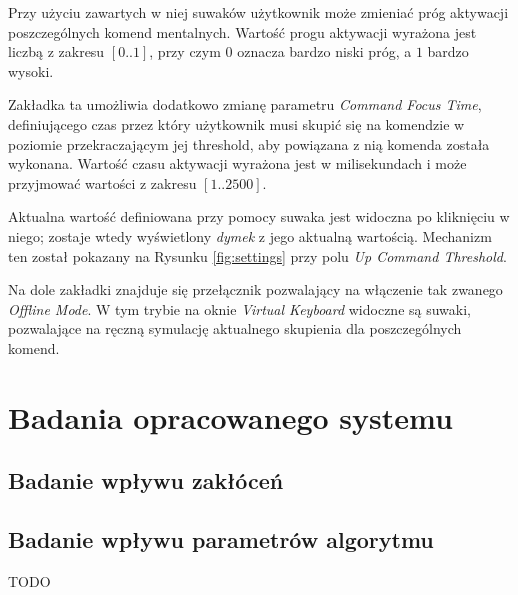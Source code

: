 \documentclass[skorowidz,skroty]{dyplomWEZUT}
\begin{document}
Przy użyciu zawartych w niej suwaków użytkownik może zmieniać próg aktywacji poszczególnych komend mentalnych. Wartość progu aktywacji wyrażona jest liczbą z zakresu $[0..1]$, przy czym $0$ oznacza bardzo niski próg, a $1$ bardzo wysoki.

Zakładka ta umożliwia dodatkowo zmianę parametru \textit{Command Focus Time}, definiującego czas przez który użytkownik musi skupić się na komendzie w poziomie przekraczającym jej threshold, aby powiązana z nią komenda została wykonana. Wartość czasu aktywacji wyrażona jest w milisekundach i może przyjmować wartości z zakresu $[1..2500]$.

Aktualna wartość definiowana przy pomocy suwaka jest widoczna po kliknięciu w niego; zostaje wtedy wyświetlony \textit{dymek} z jego aktualną wartością. Mechanizm ten został pokazany na Rysunku \vref{fig:settings} przy polu \textit{Up Command Threshold}.

Na dole zakładki znajduje się przełącznik pozwalający na włączenie tak zwanego \textit{Offline Mode}. W tym trybie na oknie \textit{Virtual Keyboard} widoczne są suwaki, pozwalające na ręczną symulację aktualnego skupienia dla poszczególnych komend.

\chapter{Badania opracowanego systemu}
\section{Badanie wpływu zakłóceń}
\section{Badanie wpływu parametrów algorytmu}



\begin{zakonczenie}\label{chap:zakonczenie}
TODO
\end{zakonczenie}

\printbibliography[heading=bibintoc]

\listoftables

\listoffigures

\listoflistings


\printindex
\end{document}
